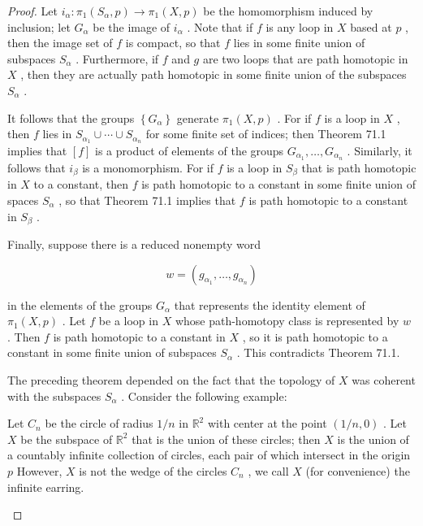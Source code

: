 \begin{proof}Let \({i}_{\alpha } : {\pi }_{1}\left( {{S}_{\alpha },p}\right)  \rightarrow  {\pi }_{1}\left( {X,p}\right)\) be the homomorphism induced by inclusion; let \({G}_{\alpha }\) be the image of \({i}_{\alpha }\) .
Note that if \(f\) is any loop in \(X\) based at \(p\) , then the image set of \(f\) is compact, so that \(f\) lies in some finite union of subspaces \({S}_{\alpha }\) . Furthermore, if \(f\) and \(g\) are two loops that are path homotopic in \(X\) , then they are actually path homotopic in some finite union of the subspaces \({S}_{\alpha }\) .

It follows that the groups \(\left\{  {G}_{\alpha }\right\}\) generate \({\pi }_{1}\left( {X,p}\right)\) . For if \(f\) is a loop in \(X\) , then \(f\) lies in \({S}_{{\alpha }_{1}} \cup  \cdots  \cup  {S}_{{\alpha }_{n}}\) for some finite set of indices; then Theorem 71.1 implies that \(\left\lbrack  f\right\rbrack\) is a product of elements of the groups \({G}_{{\alpha }_{1}},\ldots ,{G}_{{\alpha }_{n}}\) . Similarly, it follows that \({i}_{\beta }\) is a monomorphism. For if \(f\) is a loop in \({S}_{\beta }\) that is path homotopic in \(X\) to a constant, then \(f\) is path homotopic to a constant in some finite union of spaces \({S}_{\alpha }\) , so that Theorem 71.1 implies that \(f\) is path homotopic to a constant in \({S}_{\beta }\) .

Finally, suppose there is a reduced nonempty word

\[
w = \left( {{g}_{{\alpha }_{1}},\ldots ,{g}_{{\alpha }_{n}}}\right)
\]

in the elements of the groups \({G}_{\alpha }\) that represents the identity element of \({\pi }_{1}\left( {X,p}\right)\) . Let \(f\) be a loop in \(X\) whose path-homotopy class is represented by \(w\) . Then \(f\) is path homotopic to a constant in \(X\) , so it is path homotopic to a constant in some finite union of subspaces \({S}_{\alpha }\) . This contradicts Theorem 71.1.

The preceding theorem depended on the fact that the topology of \(X\) was coherent with the subspaces \({S}_{\alpha }\) . Consider the following example:

\begin{example} Let \({C}_{n}\) be the circle of radius \(1/n\) in \({\mathbb{R}}^{2}\) with center at the point \(\left( {1/n,0}\right)\) . Let \(X\) be the subspace of \({\mathbb{R}}^{2}\) that is the union of these circles; then \(X\) is the union of a countably infinite collection of circles, each pair of which intersect in the origin \(p\) However, \(X\) is not the wedge of the circles \({C}_{n}\) , we call \(X\) (for convenience) the infinite earring.


\end{example}
\end{proof}
